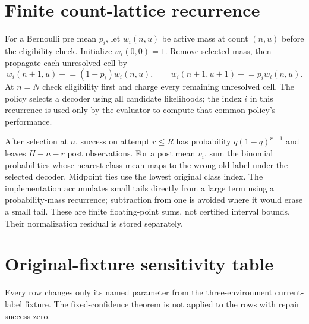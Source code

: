 \section{Finite count-lattice recurrence}
For a Bernoulli pre mean $p_i$, let $w_i(n,u)$ be active mass at count $(n,u)$
before the eligibility check. Initialize $w_i(0,0)=1$. Remove selected mass,
then propagate each unresolved cell by
\[
w_i(n+1,u)\mathrel{+}=(1-p_i)w_i(n,u),\qquad
w_i(n+1,u+1)\mathrel{+}=p_iw_i(n,u).
\]
At $n=N$ check eligibility first and charge every remaining unresolved cell.
The policy selects a decoder using all candidate likelihoods; the index $i$
in this recurrence is used only by the evaluator to compute that common
policy's performance.

After selection at $n$, success on attempt $r\le R$ has probability
$q(1-q)^{r-1}$ and leaves $H-n-r$ post observations. For a post mean $v_i$,
sum the binomial probabilities whose nearest class mean maps to the wrong
old label under the selected decoder. Midpoint ties use the lowest original
class index. The implementation accumulates small tails directly from a
large term using a probability-mass recurrence; subtraction from one is avoided
where it would erase a small tail. These are finite floating-point sums,
not certified interval bounds. Their normalization residual is stored separately.

\section{Original-fixture sensitivity table}
\label{app:original-sensitivity}
Every row changes only its named parameter from the three-environment
current-label fixture. The fixed-confidence theorem is not applied to
the rows with repair success zero.
\begin{center}\small\end{center}

